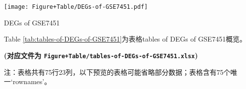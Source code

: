\documentclass[
]{article}
\begin{document}
\def\@captype{figure}
\begin{center}
\texttt{[image: Figure+Table/DEGs-of-GSE7451.pdf]}
\caption{DEGs of GSE7451}\label{fig:DEGs-of-GSE7451}
\end{center}

Table \ref{tab:tables-of-DEGs-of-GSE7451}为表格tables of DEGs of GSE7451概览。

\textbf{(对应文件为 \texttt{Figure+Table/tables-of-DEGs-of-GSE7451.xlsx})}

\begin{center}\begin{tcolorbox}[colback=gray!10, colframe=gray!50, width=0.9\linewidth, arc=1mm, boxrule=0.5pt]注：表格共有75行23列，以下预览的表格可能省略部分数据；表格含有75个唯一`rownames'。
\end{tcolorbox}
\end{center}
\end{document}
